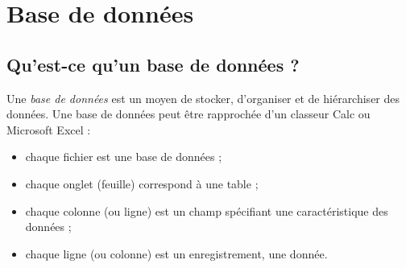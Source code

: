 \chapter{Base de données}

\section{Qu'est-ce qu'un base de données ?}

Une \emph{base de données} est un moyen de stocker, d'organiser et de hiérarchiser des données. Une base de données peut être rapprochée d'un classeur Calc ou Microsoft Excel :
\begin{itemize}
	\item chaque fichier est une base de données ;
	\item chaque onglet (feuille) correspond à une table ;
	\item chaque colonne (ou ligne) est un champ spécifiant une caractéristique des données ;
	\item chaque ligne (ou colonne) est un enregistrement, une donnée.
\end{itemize}

\Espace

